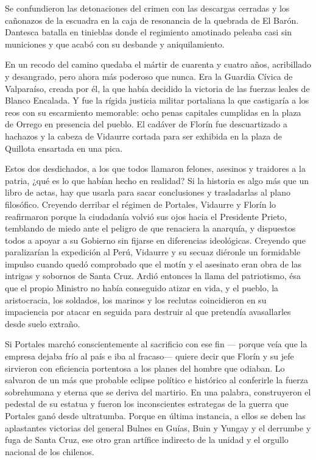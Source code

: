 \documentclass[10pt,twoside,openright]{memoir}
\begin{document}
Se confundieron las detonaciones del crimen con las descargas cerradas y
los cañonazos de la escuadra en la caja de resonancia de la quebrada de
El Barón. Dantesca batalla en tinieblas donde el regimiento amotinado
peleaba casi sin municiones y que acabó con su desbande y
aniquilamiento.

En un recodo del camino quedaba el mártir de cuarenta y cuatro años,
acribillado y desangrado, pero ahora más poderoso que nunca. Era la
Guardia Cívica de Valparaíso, creada por él, la que había decidido la
victoria de las fuerzas leales de Blanco Encalada. Y fue la rígida
justicia militar portaliana la que castigaría a los reos con su
escarmiento memorable: ocho penas capitales cumplidas en la plaza de
Orrego en presencia del pueblo. El cadáver de Florín fue descuartizado a
hachazos y la cabeza de Vidaurre cortada para ser exhibida en la plaza
de Quillota ensartada en una pica.

Estos dos desdichados, a los que todos llamaron felones, asesinos y
traidores a la patria, ¿qué es lo que habían hecho en realidad? Si la
historia es algo más que un libro de actas, hay que usarla para sacar
conclusiones y trasladarlas al plano filosófico. Creyendo derribar el
régimen de Portales, Vidaurre y Florín lo reafirmaron porque la
ciudadanía volvió sus ojos hacia el Presidente Prieto, temblando de
miedo ante el peligro de que renaciera la anarquía, y dispuestos todos a
apoyar a su Gobierno sin fijarse en diferencias ideológicas. Creyendo
que paralizarían la expedición al Perú, Vidaurre y su secuaz diéronle un
formidable impulso cuando quedó comprobado que el motín y el asesinato
eran obra de las intrigas y sobornos de Santa Cruz. Ardió entonces la
llama del patriotismo, ésa que el propio Ministro no había conseguido
atizar en vida, y el pueblo, la aristocracia, los soldados, los marinos
y los reclutas coincidieron en su impaciencia por atacar en seguida para
destruir al que pretendía avasallarles desde suelo extraño.

Si
Portales marchó conscientemente al sacrificio con ese fin --- porque
veía que la empresa dejaba frío al país e iba al fracaso--- quiere decir
que Florín y su jefe sirvieron con eficiencia portentosa a los planes
del hombre que odiaban. Lo salvaron de un más que probable eclipse
político e histórico al conferirle la fuerza sobrehumana y eterna que se
deriva del martirio. En una palabra, construyeron el pedestal de su
estatua y fueron los inconscientes
estrategas de la guerra que Portales ganó desde ultratumba. Porque en
última instancia, a ellos se deben las aplastantes victorias del general
Bulnes en Guías, Buin y Yungay y el derrumbe y fuga de Santa Cruz, ese
otro gran artífice indirecto de la unidad y el orgullo nacional de los
chilenos.
\end{document}
